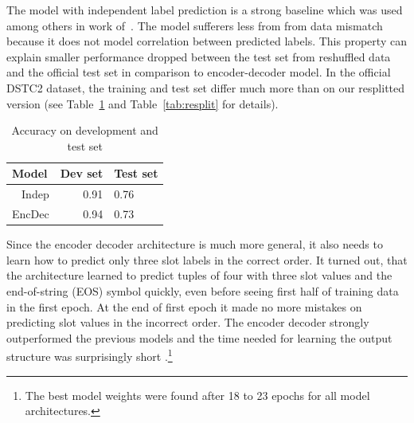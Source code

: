 \documentclass{itatnew}
\def\VH#1{\textcolor{cyan}{VH: \textit{#1}}}
\begin{document}
The model with independent label prediction is a strong baseline which was used among others in work of~\cite{zilka2015incremental}.
The model sufferers less from from data mismatch because it does not model correlation between predicted labels.
This property can explain smaller performance dropped between the test set from reshuffled data and the official test set in comparison to encoder-decoder model.
In the official DSTC2 dataset, the training and test set differ much more than on our resplitted version (see Table~\ref{tab:dstc} and Table~\ref{tab:resplit} for details).

\begin{table}
\caption{Accuracy on development and test set}
\begin{center}
\begin{tabular}{r@{\quad}rll}
\hline
\multicolumn{1}{l}{\rule{0pt}{12pt}
                   Model}&\multicolumn{1}{l}{Dev set}&\multicolumn{2}{l}{Test set}\\[2pt]
\hline\rule{0pt}{12pt}
Indep  &   0.91 & 0.76 \\
EncDec &   0.94 & 0.73 \\
\hline
\end{tabular}
\end{center}
\label{tab:dstc}
\end{table}

Since the encoder decoder architecture is much more general, it also needs to learn how to predict only three slot labels in the correct order.
It turned out, that the architecture learned to predict tuples of four with three slot values and the end-of-string (EOS) symbol quickly, even before seeing first half of training data in the first epoch.
At the end of first epoch it made no more mistakes on predicting slot values in the incorrect order.
The encoder decoder strongly outperformed the previous models and the time needed for learning the output structure was surprisingly short .\footnote{The best model weights were found after 18 to 23 epochs for all model architectures.}
\end{document}
